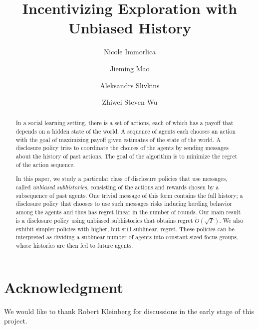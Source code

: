 \documentclass[11pt]{article}
\title{Incentivizing Exploration with Unbiased History}
\author{
Nicole Immorlica
\and
Jieming Mao
\and
Aleksandrs Slivkins
\and
Zhiwei Steven Wu
}
\begin{document}
\begin{titlepage}
\maketitle

\thispagestyle{empty}
\begin{abstract}
In a social learning setting, there is a set of actions, each of which has a payoff that depends on a hidden state of the world.  A sequence of agents each chooses an action with the goal of maximizing payoff given estimates of the state of the world.  A disclosure policy tries to coordinate the choices of the agents by sending messages about the history of past actions.  The goal of the algorithm is to minimize the regret of the action sequence.

In this paper, we study a particular class of disclosure policies that use messages, called {\em unbiased subhistories}, consisting of the actions and rewards chosen by a subsequence of past agents.  One trivial message of this form contains the full history; a disclosure policy that chooses to use such messages risks inducing herding behavior among the agents and thus has regret linear in the number of rounds.  Our main result is a disclosure policy using unbiased subhistories that obtains regret $\tilde{O}(\sqrt{T})$.  We also exhibit simpler policies with higher, but still sublinear, regret.  These policies can be interpreted as dividing a sublinear number of agents into constant-sized focus groups, whose histories are then fed to future agents.
\end{abstract}
\end{titlepage}




%










\section*{Acknowledgment}
We would like to thank Robert Kleinberg for discussions in the early stage of this project.

\appendix





%
\end{document}
